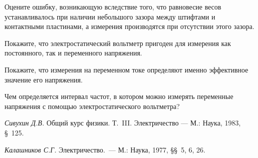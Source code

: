 \begin{lab:questions}
	\item Оцените ошибку, возникающую вследствие того, что равновесие весов устанавливалось при наличии небольшого зазора между
	штифтами и контактными пластинами, а измерения производятся при отсутствии этого зазора.
	
	\item Покажите, что электростатический вольтметр пригоден для измерения как постоянного, так и переменного напряжения.
	
	\item Покажите, что измерения на переменном токе определяют именно эффективное значение его напряжения.
	
	\item Чем определяется интервал частот, в котором можно измерять переменные напряжения с помощью электростатического
	вольтметра?
\end{lab:questions}

\begin{lab:literature}
	\item {\em Сивухин Д.В.} Общий курс физики. Т.~III. Электричество --- М.: Наука, 1983, \S~125.
	
	\item {\em Калашников С.Г.} Электричество.~--- М.: Наука, 1977, \S\S~5, 6, 26.
	
\end{lab:literature}

